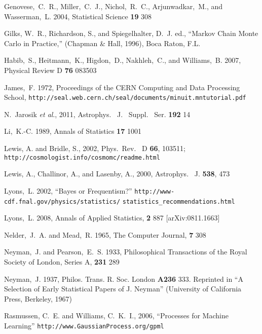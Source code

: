 \documentclass[useAMS,usenatbib]{aastex}
\begin{document}
\begin{thebibliography}{99}
Genovese,~C.~R., Miller,~C.~J., Nichol,~R.~C., Arjunwadkar,~M., and
Wasserman,~L. 2004, Statistical Science {\bf 19} 308

Gilks, W.~R., Richardson, S., and Spiegelhalter, D.~J. ed.,
``Markov Chain Monte Carlo in Practice,'' (Chapman \& Hall, 1996),
Boca Raton, F.L.

Habib,~S., Heitmann,~K., Higdon,~D., Nakhleh,~C., and
Williams,~B. 2007, Physical Review D {\bf 76} 083503

James,~F. 1972, Proceedings of the CERN Computing and Data Processing School,
\verb|http://seal.web.cern.ch/seal/documents/minuit.mntutorial.pdf|

N.~Jarosik {\it et al}., 2011, Astrophys. \ J. \ Suppl. \ Ser. {\bf 192} 14

Li,~K.-C. 1989, Annals of Statistics {\bf 17} 1001

Lewis, A. and Bridle, S., 2002, Phys.\ Rev. \ D {\bf 66}, 103511;
\verb|http://cosmologist.info/cosmomc/readme.html|

Lewis, A., Challinor, A., and Lasenby, A., 2000, 
Astrophys. \ J. {\bf 538}, 473

Lyons,~L. 2002, ``Bayes or Frequentism?''
\verb|http://www-cdf.fnal.gov/physics/statistics/|
\verb|statistics_recommendations.html|

Lyons,~L. 2008, Annals of Applied Statistics, {\bf 2} 887
[arXiv:0811.1663]

Nelder,~J.~A. and Mead,~R. 1965, The Computer Journal, {\bf 7} 308

Neyman,~J. and Pearson,~E.~S. 1933, Philosophical Transactions
of the Royal Society of London, Series A, {\bf 231} 289

Neyman,~J. 1937, Philos. Trans. R. Soc. London {\bf A236} 333.
Reprinted in ``A Selection of Early Statistical Papers of J. Neyman''
(University of California Press, Berkeley, 1967)

Rasmussen, C.~E. and Williams, C.~K.~I., 2006, ``Processes for Machine Learning''
\verb|http://www.GaussianProcess.org/gpml|


\end{thebibliography}
\end{document}
